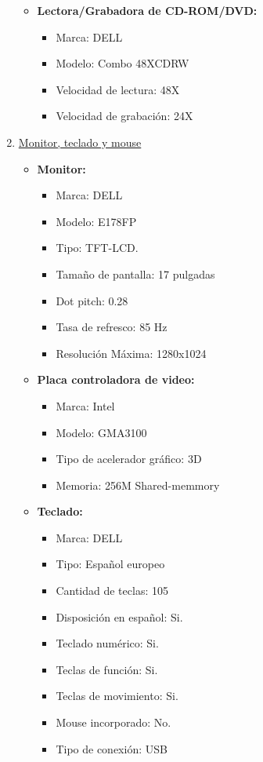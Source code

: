 \begin{enumerate}
\begin{itemize}
    \item \textbf{Lectora/Grabadora de CD-ROM/DVD:}
    \begin{itemize}
      \item Marca: DELL
      \item Modelo: Combo 48XCDRW
      \item Velocidad de lectura: 48X
      \item Velocidad de grabación: 24X
    \end{itemize}
  \end{itemize}
  
  \item \underline{Monitor, teclado y mouse}
  \begin{itemize}
    \item \textbf{Monitor:}
    \begin{itemize}
      \item Marca: DELL
      \item Modelo: E178FP
      \item Tipo: TFT-LCD.
      \item Tamaño de pantalla: 17 pulgadas
      \item Dot pitch: 0.28
      \item Tasa de refresco: 85 Hz
      \item Resolución Máxima: 1280x1024
    \end{itemize}
    
    \item \textbf{Placa controladora de video:}
    \begin{itemize}
      \item Marca: Intel
      \item Modelo: GMA3100
      \item Tipo de acelerador gráfico: 3D
      \item Memoria: 256M Shared-memmory
    \end{itemize}
    
    \item \textbf{Teclado:}
    \begin{itemize}
      \item Marca: DELL
      \item Tipo: Español europeo
      \item Cantidad de teclas: 105
      \item Disposición en español: Si.
      \item Teclado numérico: Si.
      \item Teclas de función: Si.
      \item Teclas de movimiento: Si.
      \item Mouse incorporado: No.
      \item Tipo de conexión: USB
    \end{itemize}
    

\end{itemize}
\end{enumerate}
